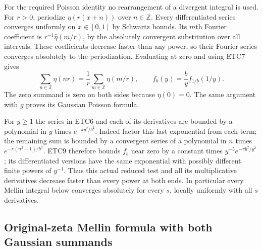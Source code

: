\documentclass[11pt]{article}
\begin{document}
For the required Poisson identity no rearrangement of a divergent
integral is used. For $r>0$, periodize $\eta(r(x+n))$ over
$n\in\mathbb Z$. Every differentiated series converges uniformly
on $x\in[0,1]$ by Schwartz bounds. Its $m$th Fourier coefficient
is $r^{-1}\widehat\eta(m/r)$, by the absolutely convergent
substitution over all intervals. These coefficients decrease faster
than any power, so their Fourier series converges absolutely to the
periodization. Evaluating at zero and using ETC7 gives
\begin{equation}\tag{ETC9}
 \sum_{n\in\mathbb Z}\eta(nr)
 =\frac1r\sum_{m\in\mathbb Z}\eta(m/r),\qquad
 f_b(y)=\frac b y f_{1/b}(1/y).
\end{equation}
The zero summand is zero on both sides because $\eta(0)=0$.
The same argument with $g$ proves its Gaussian Poisson formula.

For $y\ge1$ the series in ETC6 and each of its derivatives are
bounded by a polynomial in $y$ times $e^{-\pi y^2/b^2}$.
Indeed factor this last exponential from each term; the remaining
sum is bounded by a convergent series of a polynomial in $n$ times
$e^{-\pi(n^2-1)/b^2}$. ETC9 therefore bounds $f_b$ near zero
by a constant times $y^{-5}e^{-\pi b^2/y^2}$; its differentiated
versions have the same exponential with possibly different finite
powers of $y^{-1}$. Thus this actual reduced test and all its
multiplicative derivatives decrease faster than every power at both
ends. In particular every Mellin integral below converges absolutely
for every $s$, locally uniformly with all $s$ derivatives.

\subsection{Original-zeta Mellin formula with both Gaussian summands}
\end{document}
